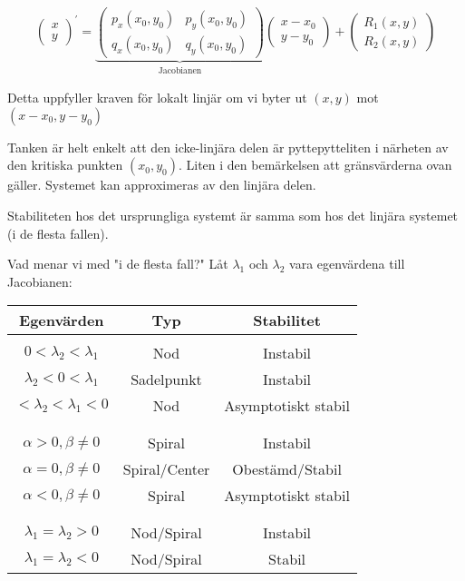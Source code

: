 \begin{equation*}
  \begin{gathered}
    \begin{pmatrix}x\\y\end{pmatrix}^{\prime} = \underbrace{\begin{pmatrix}p_x(x_0,y_0)&p_y(x_0,y_0)\\q_x(x_0,y_0)&q_y(x_0,y_0)\end{pmatrix}}_{\text{Jacobianen}}\begin{pmatrix}x-x_0\\y-y_0\end{pmatrix}+\begin{pmatrix}R_1(x,y)\\R_2(x,y)\end{pmatrix}
  \end{gathered}
\end{equation*}
\par\bigskip
\noindent Detta uppfyller kraven för lokalt linjär om vi byter ut $(x,y)$ mot $(x-x_0,y-y_0)$
\par\bigskip
\noindent Tanken är helt enkelt att den icke-linjära delen är pyttepytteliten i närheten av den kritiska punkten $(x_0,y_0)$. Liten i den bemärkelsen att gränsvärderna ovan gäller. Systemet kan approximeras av den linjära delen.
\par\bigskip
\noindent Stabiliteten hos det ursprungliga systemt är samma som hos det linjära systemet (i de flesta fallen).\par
\noindent Vad menar vi med "i de flesta fall?" Låt $\lambda_1$ och $\lambda_2$ vara egenvärdena till Jacobianen:\par
\begin{center}
  \begin{tabular}{c | c | c}
    Egenvärden&Typ&Stabilitet\\
    \hline\\
    $0<\lambda_2<\lambda_1$&Nod&Instabil\\
    $\lambda_2<0<\lambda_1$&Sadelpunkt&Instabil\\
    $<\lambda_2<\lambda_1<0$&Nod&Asymptotiskt stabil\\\\
    \hline\\
    $\alpha>0, \beta\neq0$&Spiral&Instabil\\
    $\alpha=0, \beta\neq0$&Spiral/Center&Obestämd/Stabil\\
    $\alpha<0, \beta\neq0$&Spiral&Asymptotiskt stabil\\\\
    \hline\\
    $\lambda_1=\lambda_2 > 0$&Nod/Spiral&Instabil\\
    $\lambda_1=\lambda_2<0$&Nod/Spiral&Stabil\\
  \end{tabular}
\end{center}
